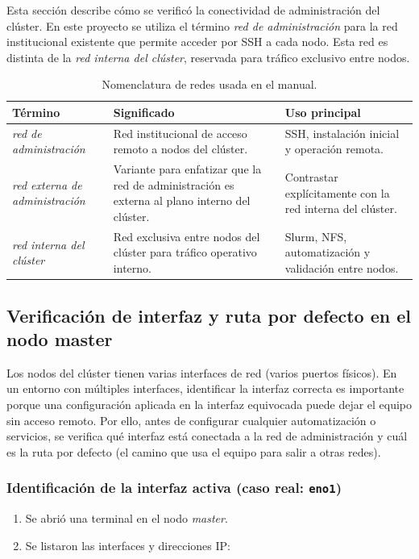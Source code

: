 Esta sección describe cómo se verificó la conectividad de administración del clúster. En este proyecto se utiliza el término \textit{red de administración} para la red institucional existente que permite acceder por SSH a cada nodo. Esta red es distinta de la \textit{red interna del clúster}, reservada para tráfico exclusivo entre nodos.

\begin{table}[H]
\centering
\caption{Nomenclatura de redes usada en el manual.}
\label{tab:nomenclatura_redes}
\begin{tabular}{@{}>{\raggedright\arraybackslash}p{}>{\raggedright\arraybackslash}p{}>{\raggedright\arraybackslash}p{}@{}}
\hline
\textbf{Término} & \textbf{Significado} & \textbf{Uso principal} \\
\hline
\textit{red de administración} & Red institucional de acceso remoto a nodos del clúster. & SSH, instalación inicial y operación remota. \\
\textit{red externa de administración} & Variante para enfatizar que la red de administración es externa al plano interno del clúster. & Contrastar explícitamente con la red interna del clúster. \\
\textit{red interna del clúster} & Red exclusiva entre nodos del clúster para tráfico operativo interno. & Slurm, NFS, automatización y validación entre nodos. \\
\hline
\end{tabular}
\end{table}

\subsection{Verificación de interfaz y ruta por defecto en el nodo master}
\label{subsec:verificacion_red_master}

Los nodos del clúster tienen varias interfaces de red (varios puertos físicos). En un entorno con múltiples interfaces, identificar la interfaz correcta es importante porque una configuración aplicada en la interfaz equivocada puede dejar el equipo sin acceso remoto. Por ello, antes de configurar cualquier automatización o servicios, se verifica qué interfaz está conectada a la red de administración y cuál es la ruta por defecto (el camino que usa el equipo para salir a otras redes). \cite{iproute2_ip,iproute2_ip_route}

\subsubsection*{Identificación de la interfaz activa (caso real: \texttt{eno1})}
\begin{enumerate}
  \item Se abrió una terminal en el nodo \textit{master}.
  \item Se listaron las interfaces y direcciones IP:
\end{enumerate}

